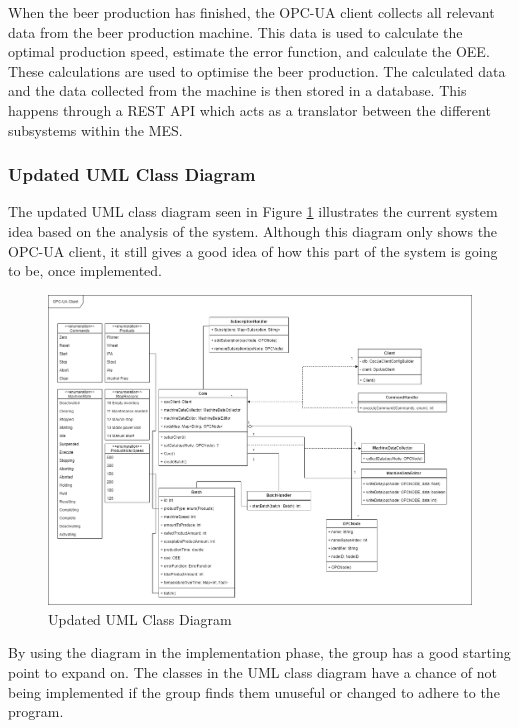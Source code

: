 When the beer production has finished, the OPC-UA client collects all relevant
data from the beer production machine. This data is used to calculate the
optimal production speed, estimate the error function, and calculate the OEE.
These calculations are used to optimise the beer production. The calculated data
and the data collected from the machine is then stored in a database. This
happens through a REST API which acts as a translator between the different 
subsystems within the MES.

\subsubsection{Updated UML Class Diagram}
The updated UML class diagram seen in Figure
\ref{figure:updated_UML_class_diagram} illustrates the current system idea based
on the analysis of the system. Although this diagram only shows the 
OPC-UA client, it still gives a good idea of how this part of the system is going
to be, once implemented.

\begin{figure}[ht]
\centering 
\includegraphics[scale=0.3]{images/diagrams/updated_UML_Class_Diagram.drawio.png}
\caption{Updated UML Class Diagram}
\label{figure:updated_UML_class_diagram} 
\end{figure}

By using the diagram in the implementation phase, the group has a good starting 
point to expand on. The classes in the UML class diagram have a chance of not 
being implemented if the group finds them unuseful or changed to adhere to the 
program.
